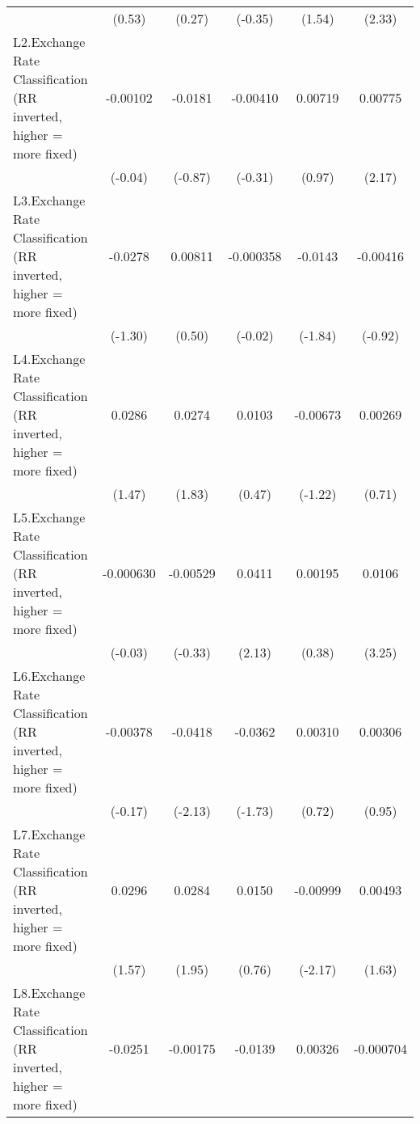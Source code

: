 {\begin{longtable}{l*{5}{c}}
                &   (0.53)         &   (0.27)         &  (-0.35)         &   (1.54)         &   (2.33)         \\
\addlinespace
L2.Exchange Rate Classification (RR inverted, higher = more fixed)& -0.00102         &  -0.0181         & -0.00410         &  0.00719         &  0.00775\sym{*}  \\
                &  (-0.04)         &  (-0.87)         &  (-0.31)         &   (0.97)         &   (2.17)         \\
\addlinespace
L3.Exchange Rate Classification (RR inverted, higher = more fixed)&  -0.0278         &  0.00811         &-0.000358         &  -0.0143         & -0.00416         \\
                &  (-1.30)         &   (0.50)         &  (-0.02)         &  (-1.84)         &  (-0.92)         \\
\addlinespace
L4.Exchange Rate Classification (RR inverted, higher = more fixed)&   0.0286         &   0.0274         &   0.0103         & -0.00673         &  0.00269         \\
                &   (1.47)         &   (1.83)         &   (0.47)         &  (-1.22)         &   (0.71)         \\
\addlinespace
L5.Exchange Rate Classification (RR inverted, higher = more fixed)&-0.000630         & -0.00529         &   0.0411\sym{*}  &  0.00195         &   0.0106\sym{**} \\
                &  (-0.03)         &  (-0.33)         &   (2.13)         &   (0.38)         &   (3.25)         \\
\addlinespace
L6.Exchange Rate Classification (RR inverted, higher = more fixed)& -0.00378         &  -0.0418\sym{*}  &  -0.0362         &  0.00310         &  0.00306         \\
                &  (-0.17)         &  (-2.13)         &  (-1.73)         &   (0.72)         &   (0.95)         \\
\addlinespace
L7.Exchange Rate Classification (RR inverted, higher = more fixed)&   0.0296         &   0.0284         &   0.0150         & -0.00999\sym{*}  &  0.00493         \\
                &   (1.57)         &   (1.95)         &   (0.76)         &  (-2.17)         &   (1.63)         \\
\addlinespace
L8.Exchange Rate Classification (RR inverted, higher = more fixed)&  -0.0251         & -0.00175         &  -0.0139         &  0.00326         &-0.000704         \\

\end{longtable}}
